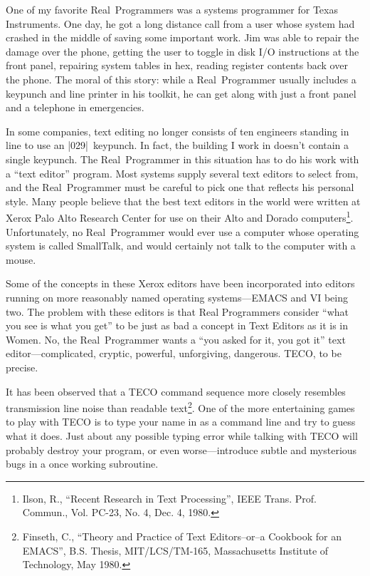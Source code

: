 \documentclass[10pt,letterpaper]{article}
\newcommand{\acro}[1]{{\small #1\spacefactor1000}}
\begin{document}
One of my favorite Real~Programmers was a systems programmer for Texas
Instruments. One day, he got a long distance call from a user whose
system had crashed in the middle of saving some important work. Jim
was able to repair the damage over the phone, getting the user to
toggle in disk \acro{I/O} instructions at the front panel, repairing system
tables in hex, reading register contents back over the phone. The
moral of this story: while a Real~Programmer usually includes a
keypunch and line printer in his toolkit, he can get along with just a
front panel and a telephone in emergencies.

In some companies, text editing no longer consists of ten engineers
standing in line to use an |029|~keypunch. In fact, the building I work
in doesn't contain a single keypunch. The Real~Programmer in this
situation has to do his work with a ``text editor'' program. Most
systems supply several text editors to select from, and the Real~Programmer
must be careful to pick one that reflects his personal
style. Many people believe that the best text editors in the world
were written at Xerox Palo Alto Research Center for use on their Alto
and Dorado computers\footnote{%
Ilson, R., ``Recent Research in Text Processing'', IEEE Trans. Prof. Commun., Vol. PC-23, No. 4, Dec. 4, 1980.}.
Unfortunately, no Real~Programmer would ever
use a computer whose operating system is called SmallTalk, and would
certainly not talk to the computer with a mouse.

Some of the concepts in these Xerox editors have been incorporated
into editors running on more reasonably named operating systems---\acro{EMACS}
and \acro{VI} being two. The problem with these editors is that Real
Programmers consider ``what you see is what you get'' to be just as bad
a concept in Text Editors as it is in Women. No, the Real~Programmer
wants a ``you asked for it, you got it'' text editor---complicated,
cryptic, powerful, unforgiving, dangerous. \acro{TECO}, to be precise.

It has been observed that a \acro{TECO} command sequence more closely
resembles transmission line noise than readable text\footnote{%
Finseth, C., ``Theory and Practice of Text Editors--or--a Cookbook for an EMACS'', B.S. Thesis, MIT/LCS/TM-165, Massachusetts Institute of Technology, May 1980.}.
One of the
more entertaining games to play with \acro{TECO} is to type your name in as a
command line and try to guess what it does. Just about any possible
typing error while talking with \acro{TECO} will probably destroy your
program, or even worse---introduce subtle and mysterious bugs in a
once working subroutine.
\end{document}
